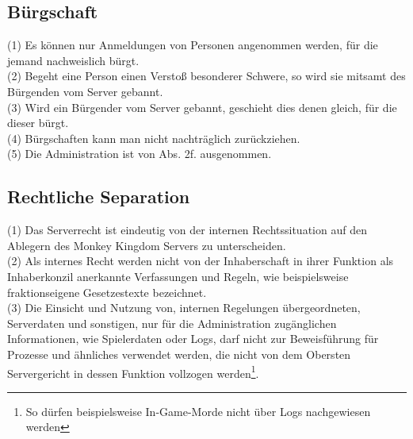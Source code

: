 \documentclass{article}
\begin{document}
\subsection{Bürgschaft}
(1) Es können nur Anmeldungen von Personen angenommen werden, für die jemand nachweislich bürgt.\\
(2) Begeht eine Person einen Verstoß besonderer Schwere, so wird sie mitsamt des Bürgenden vom Server gebannt.\\
(3) Wird ein Bürgender vom Server gebannt, geschieht dies denen gleich, für die dieser bürgt.\\
(4) Bürgschaften kann man nicht nachträglich zurückziehen.\\
(5) Die Administration ist von Abs. 2f. ausgenommen.\\

\subsection{Rechtliche Separation}
(1) Das Serverrecht ist eindeutig von der internen Rechtssituation auf den Ablegern des Monkey Kingdom Servers zu unterscheiden.\\
(2) Als internes Recht werden nicht von der Inhaberschaft in ihrer Funktion als Inhaberkonzil anerkannte Verfassungen und Regeln, wie beispielsweise fraktionseigene Gesetzestexte bezeichnet.\\
(3) Die Einsicht und Nutzung von, internen Regelungen übergeordneten, Serverdaten und sonstigen, nur für die Administration zugänglichen Informationen, wie Spielerdaten oder Logs, darf nicht zur Beweisführung für Prozesse und ähnliches verwendet werden, die nicht von dem Obersten Servergericht in dessen Funktion vollzogen werden\footnote{So dürfen beispielsweise In-Game-Morde nicht über Logs nachgewiesen werden}.
\end{document}
